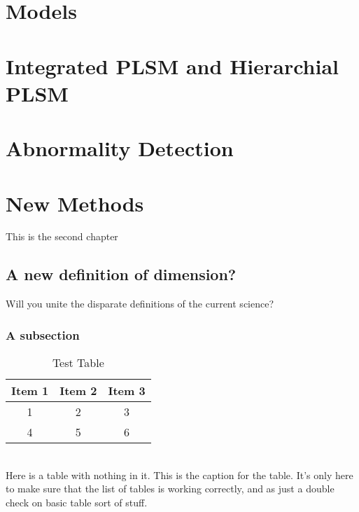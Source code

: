\documentclass[reqno]{csuthesis}
\begin{document}
\chapter{Models}

\chapter{Integrated PLSM and Hierarchial PLSM}

\chapter{Abnormality Detection}






\chapter{New Methods}

This is the second chapter

\section{A new definition of dimension?}

Will you unite the disparate definitions of the current science? 

\subsection{A subsection}

\begin{table}[htp]
\caption{Test Table \label{table:faketable}}
\begin{tabular}{|c|c|c|}
\hline
Item 1 & Item 2 & Item 3\\
\hline
1 & 2 & 3 \\
4 & 5 & 6 \\
\hline
\end{tabular}
\begin{minipage}{0.9\textwidth} ~\\ \footnotesize
Here is a table with nothing in it.  This is the caption for the table.  It's only here to make sure that the list of tables is working correctly, and as just a double check on basic table sort of stuff.
\end{minipage}%
\end{table}
\end{document}
